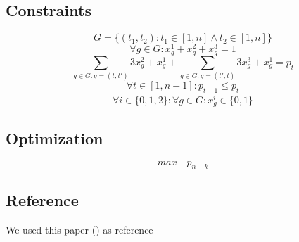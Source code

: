 \documentclass{article}
\begin{document}
\subsection{Constraints}
\[ G = \{(t_1,t_2) : t_1 \in [1,n] \wedge t_2 \in [1,n]\} \]
\[ \forall g \in G : x^1_g + x^2_g + x^3_g = 1 \]
\[ \sum_{g \in G : g=(t,t')} 3x^2_g+x^1_g + \sum_{g \in G : g=(t',t)} 3x^3_g+x^1_g = p_t \]
\[ \forall t \in [1,n-1] : p_{t+1} \leq p_t \]
\[ \forall i \in \{0,1,2\} : \forall g \in G : x^i_g \in \{0,1\} \]

\subsection{Optimization}

\[ max\quad p_{n-k} \]

\subsection{Reference}

We used this paper (\cite{integer_programming_sports_ranking}) as reference
\clearpage

 

\end{document}
